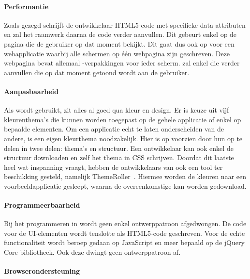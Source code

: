 \paragraph{Performantie}
Zoals gezegd schrijft de ontwikkelaar HTML5-code met specifieke data attributen en zal het raamwerk daarna de code verder aanvullen. 
Dit gebeurt enkel op de pagina die de gebruiker op dat moment bekijkt. 
Dit gaat dus ook op voor een webapplicatie waarbij alle schermen op één webpagina zijn geschreven. 
Deze webpagina bevat allemaal -verpakkingen voor ieder scherm. 
\jqm{} zal enkel die  verder aanvullen die op dat moment getoond wordt aan de gebruiker. 

\paragraph{Aanpasbaarheid}
Als \jqm{}  wordt gebruikt, zit alles al goed qua kleur en design. 
Er is keuze uit vijf kleurenthema's die kunnen worden toegepast op de gehele applicatie of enkel op bepaalde elementen. 
Om een applicatie echt te laten onderscheiden van de andere, is een eigen kleurthema noodzakelijk. 
Hier is \jqm{} op voorzien door hun  op te delen in twee delen: thema's en structuur. 
Een ontwikkelaar kan ook enkel de structuur downloaden en zelf het thema in CSS schrijven. 
Doordat dit laatste heel wat inspanning vraagt, hebben de ontwikkelaars van \jqm{} ook een tool ter beschikking gesteld, namelijk ThemeRoller~\cite{JQuery2012c}. 
Hiermee worden de kleuren naar een voorbeeldapplicatie gesleept, waarna de overeenkomstige  kan worden gedownload.

\paragraph{Programmeerbaarheid}
Bij het programmeren in \jqm{} wordt geen enkel ontwerppatroon afgedwongen. 
De code voor de UI-elementen wordt tenslotte als HTML5-code geschreven. 
Voor de echte functionaliteit wordt beroep gedaan op JavaScript en meer bepaald op de jQuery Core bibliotheek. 
Ook deze dwingt geen ontwerppatroon af.

\paragraph{Browserondersteuning}
\label{sec:jqm-browser-support}


